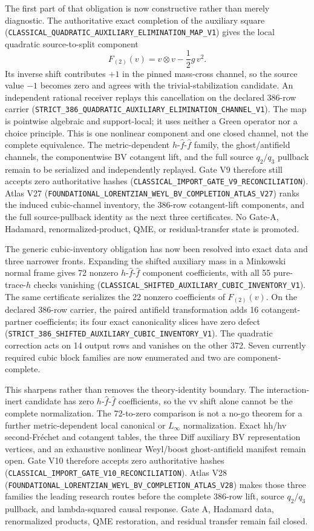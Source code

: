 \documentclass[11pt]{article}
\theoremstyle{definition}
\theoremstyle{remark}
\newcommand{\cert}[1]{\nolinkurl{#1}}
\begin{document}
The first part of that obligation is now constructive rather than merely
diagnostic.  The authoritative exact completion of the auxiliary square
(\cert{CLASSICAL_QUADRATIC_AUXILIARY_ELIMINATION_MAP_V1}) gives the local
quadratic source-to-split component
\[
  F_{(2)}(v)=v\otimes v-\frac12 g\,v^2 .
\]
Its inverse shift contributes \(+1\) in the pinned mass-cross channel, so the
source value \(-1\) becomes zero and agrees with the trivial-stabilization
candidate.  An independent rational receiver replays this cancellation on the
declared 386-row carrier
(\cert{STRICT_386_QUADRATIC_AUXILIARY_ELIMINATION_CHANNEL_V1}).  The map is
pointwise algebraic and support-local; it uses neither a Green operator nor a
choice principle.  This is one nonlinear component and one closed channel,
not the complete equivalence.  The metric-dependent
\(h\text{-}\widehat f\text{-}\widehat f\) family, the ghost/antifield channels,
the componentwise BV cotangent lift, and the full source \(q_2/q_3\) pullback
remain to be serialized and independently replayed.  Gate V9 therefore still
accepts zero authoritative hashes
(\cert{CLASSICAL_IMPORT_GATE_V9_RECONCILIATION}).  Atlas V27
(\cert{FOUNDATIONAL_LORENTZIAN_WEYL_BV_COMPLETION_ATLAS_V27}) ranks the induced
cubic-channel inventory, the 386-row cotangent-lift components, and the full
source-pullback identity as the next three certificates.  No Gate-A,
Hadamard, renormalized-product, QME, or residual-transfer state is promoted.

The generic cubic-inventory obligation has now been resolved into exact data
and three narrower fronts.  Expanding the shifted auxiliary mass in a
Minkowski normal frame gives 72 nonzero
\(h\text{-}\widehat f\text{-}\widehat f\) component coefficients, with all 55
pure-trace-\(h\) checks vanishing
(\cert{CLASSICAL_SHIFTED_AUXILIARY_CUBIC_INVENTORY_V1}).  The same certificate
serializes the 22 nonzero coefficients of \(F_{(2)}(v)\).  On the declared
386-row carrier, the paired antifield transformation adds 16 cotangent-partner
coefficients; its four exact canonicality slices have zero defect
(\cert{STRICT_386_SHIFTED_AUXILIARY_CUBIC_INVENTORY_V1}).  The quadratic
correction acts on 14 output rows and vanishes on the other 372.  Seven
currently required cubic block families are now enumerated and two are
component-complete.

This sharpens rather than removes the theory-identity boundary.  The
interaction-inert candidate has zero
\(h\text{-}\widehat f\text{-}\widehat f\) coefficients, so the vv shift alone
cannot be the complete normalization.  The 72-to-zero comparison is not a
no-go theorem for a further metric-dependent local canonical or
\(L_\infty\) normalization.  Exact hh/hv second-Fr\'echet and cotangent tables,
the three Diff auxiliary BV representation vertices, and an exhaustive
nonlinear Weyl/boost ghost-antifield manifest remain open.  Gate V10 therefore
accepts zero authoritative hashes
(\cert{CLASSICAL_IMPORT_GATE_V10_RECONCILIATION}).  Atlas V28
(\cert{FOUNDATIONAL_LORENTZIAN_WEYL_BV_COMPLETION_ATLAS_V28}) makes those three
families the leading research routes before the complete 386-row lift, source
\(q_2/q_3\) pullback, and lambda-squared causal response.  Gate A, Hadamard
data, renormalized products, QME restoration, and residual transfer remain
fail closed.
\end{document}
